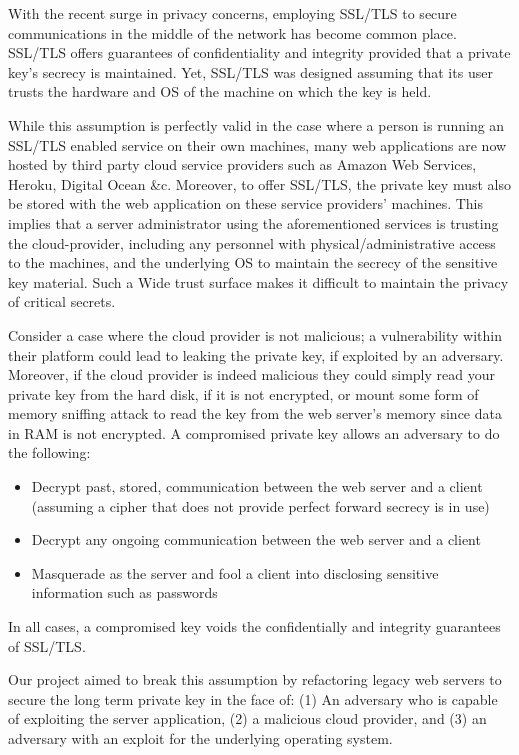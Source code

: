 \documentclass[../main.tex]{subfiles}
\begin{document}
With the recent surge in privacy concerns, employing SSL/TLS to secure
communications in the middle of the network has become common
place. SSL/TLS offers guarantees of confidentiality and integrity
provided that a private key's secrecy is maintained. Yet, SSL/TLS was
designed assuming that its user trusts the hardware and OS of the
machine on which the key is held.
 
While this assumption is perfectly valid in the case where a person is
running an SSL/TLS enabled service on their own machines, many web
applications are now hosted by third party cloud service providers
such as Amazon Web Services, Heroku, Digital Ocean \&c. Moreover, to
offer SSL/TLS, the private key must also be stored with the web
application on these service providers' machines.  This implies that a
server administrator using the aforementioned services is trusting the
cloud-provider, including any personnel with physical/administrative
access to the machines, and the underlying OS to maintain the secrecy
of the sensitive key material. Such a Wide trust surface makes it
difficult to maintain the privacy of critical secrets.

Consider a case where the cloud provider is not malicious; a
vulnerability within their platform could lead to leaking the private
key, if exploited by an adversary. Moreover, if the cloud provider is
indeed malicious they could simply read your private key from the hard
disk, if it is not encrypted, or mount some form of memory sniffing
attack to read the key from the web server's memory since data in RAM
is not encrypted. A compromised private key allows an adversary to do
the following:
\begin{itemize}
  \item Decrypt past, stored, communication between the web server and a
    client (assuming a cipher that does not provide perfect forward
    secrecy is in use)
  \item Decrypt any ongoing communication between the web server and a
    client
  \item Masquerade as the server and fool a client into disclosing
    sensitive information such as passwords
\end{itemize}
In all cases, a compromised key voids the confidentially and integrity
guarantees of SSL/TLS.

Our project aimed to break this assumption by refactoring legacy web
servers to secure the long term private key in the face of: (1) An
adversary who is capable of exploiting the server application, (2) a
malicious cloud provider, and (3) an adversary with an exploit for the
underlying operating system.
\end{document}
